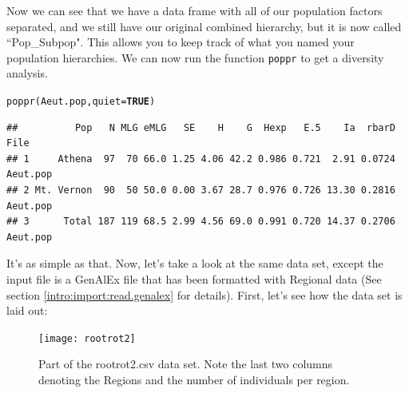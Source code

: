 \documentclass[letterpaper]{article}\usepackage[]{graphicx}\usepackage[]{color}
\makeatletter
\newcommand{\hlnum}[1]{\textcolor[rgb]{0.502,0,0.502}{\textbf{#1}}}%
\newcommand{\hlstd}[1]{\textcolor[rgb]{0,0,0}{#1}}%
\newcommand{\hlkwc}[1]{\textcolor[rgb]{0,0.502,0.753}{#1}}%
\newcommand{\hlkwd}[1]{\textcolor[rgb]{0,0.267,0.4}{#1}}%
\newenvironment{kframe}{%
 \def\at@end@of@kframe{}%
 \ifinner\ifhmode%
  \def\at@end@of@kframe{\end{minipage}}%
  \begin{minipage}{\columnwidth}%
 \fi\fi%
 \def\FrameCommand##1{\hskip\@totalleftmargin \hskip-\fboxsep
 \colorbox{shadecolor}{##1}\hskip-\fboxsep
     \hskip-\linewidth \hskip-\@totalleftmargin \hskip\columnwidth}%
 \MakeFramed {\advance\hsize-\width
   \@totalleftmargin\z@ \linewidth\hsize
   \@setminipage}}%
 {\par\unskip\endMakeFramed%
 \at@end@of@kframe}
\newenvironment{knitrout}{}{} %
\makeatother
\begin{document}
Now we can see that we have a data frame with all of our population factors separated, and we still have our original combined hierarchy, but it is now called ``Pop\_Subpop". This allows you to keep track of what you named your population hierarchies. We can now run the function \texttt{poppr} to get a diversity analysis.
\begin{knitrout}\footnotesize
{}\color{fgcolor}\begin{kframe}
\begin{alltt}
\hlkwd{poppr}\hlstd{(Aeut.pop,} \hlkwc{quiet} \hlstd{=} \hlnum{TRUE}\hlstd{)}
\end{alltt}
\begin{verbatim}
##          Pop   N MLG eMLG   SE    H    G  Hexp   E.5    Ia  rbarD     File
## 1     Athena  97  70 66.0 1.25 4.06 42.2 0.986 0.721  2.91 0.0724 Aeut.pop
## 2 Mt. Vernon  90  50 50.0 0.00 3.67 28.7 0.976 0.726 13.30 0.2816 Aeut.pop
## 3      Total 187 119 68.5 2.99 4.56 69.0 0.991 0.720 14.37 0.2706 Aeut.pop
\end{verbatim}
\end{kframe}
\end{knitrout}

It's as simple as that. Now, let's take a look at the same data set, except the input file is a GenAlEx file that has been formatted with Regional data (See section \ref{intro:import:read.genalex} for details). First, let's see how the data set is laid out:


\begin{figure}[h!]
  \centering
  \caption{\footnotesize \footnotesize Part of the rootrot2.csv data set. Note the last two columns denoting the Regions and the number of individuals per region.}
  \label{rootrot2_csv}
\texttt{[image: rootrot2]}
\end{figure}

\begin{center}
\end{center}
\end{document}
